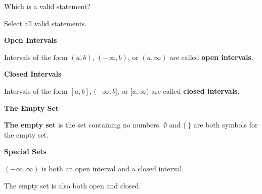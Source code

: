 \documentclass{ximera}
\begin{document}
\begin{question}

Which is a valid statement?
    \begin{multipleChoice}
    \choice {$3 \notin [1, \infty]$}
    \choice [correct]{$-3 \notin [1, \infty)$}
    \end{multipleChoice}
\end{question}



\begin{question}

Select all valid statements.
    \begin{selectAll}
    \choice {$4 \in [-3, -5]$}
    \choice [correct]{$4 \in [1, 8)$}
    \choice [correct]{$5 \notin (-\infty, -4]$}
    \choice {$0 \notin [-\infty, 7)$}
    \choice [correct]{$0 \in (-1, 2]$}
    \choice {$0 \in [6, 2]$}
    \end{selectAll}
\end{question}








\begin{definition} \textbf{\textcolor{green!50!black}{Open Intervals}}

Intervals of the form $(a, b)$, $(-\infty, b)$, or $(a, \infty)$ are called \textbf{open intervals}.

\end{definition}



\begin{definition} \textbf{\textcolor{green!50!black}{Closed Intervals}}

Intervals of the form $[a, b]$, $(-\infty, b]$, or $[a, \infty)$ are called \textbf{closed intervals}.

\end{definition}





\begin{definition} \textbf{\textcolor{green!50!black}{The Empty Set}}

\textbf{The empty set} is the set containing no numbers.  $\emptyset$ and $\{  \, \}$ are both symbols for the empty set.

\end{definition}



\begin{warning}  \textbf{\textcolor{red!70!black}{Special Sets}}

$(-\infty, \infty)$ is both an open interval and a closed interval.

The empty set is also both open and closed.

\end{warning}
\end{document}
